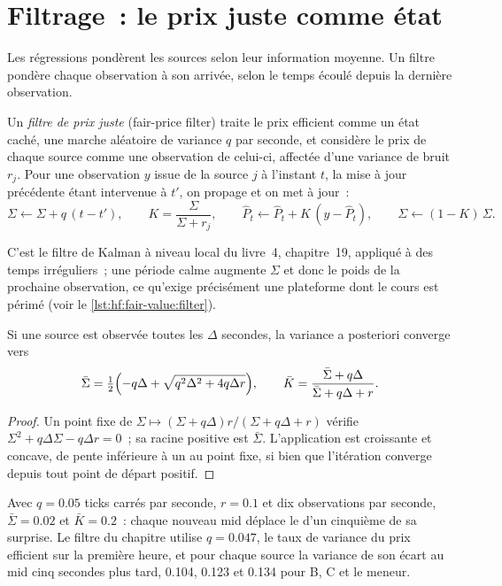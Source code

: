 \section{Filtrage~: le prix juste comme état}

Les régressions pondèrent les sources selon leur information moyenne. Un filtre pondère chaque observation à son arrivée, selon le temps écoulé depuis la
dernière observation.

\begin{definition}\label{def:hf:fair-value:filter}
Un \emph{filtre de prix juste} (fair-price filter) traite le prix efficient comme un état caché, une marche aléatoire de variance $q$ par seconde, et
considère le prix de chaque source comme une observation de celui-ci, affectée d'une variance de bruit $r_j$. Pour une observation $y$ issue de la source $j$ à l'instant $t$, la mise à jour précédente
étant intervenue à $t'$, on propage et on met à jour~:
\[
\Sigma\leftarrow\Sigma+q\,(t-t'),\qquad K=\frac{\Sigma}{\Sigma+r_j},\qquad \hat P_t\leftarrow\hat P_t+K\,(y-\hat P_t),\qquad \Sigma\leftarrow(1-K)\,\Sigma .
\]
\end{definition}

C'est le filtre de Kalman à niveau local du livre~4, chapitre~19, appliqué à des temps irréguliers~; une période calme augmente $\Sigma$ et donc le poids de la
prochaine observation, ce qu'exige précisément une plateforme dont le cours est périmé (voir le \cref{lst:hf:fair-value:filter}).

\begin{proposition}\label{prop:hf:fair-value:steady}
Si une source est observée toutes les $\Delta$ secondes, la variance a posteriori converge vers
\[
\bar\Sigma=\tfrac12\Bigl(-q\Delta+\sqrt{q^2\Delta^2+4q\Delta r}\Bigr),\qquad \bar K=\frac{\bar\Sigma+q\Delta}{\bar\Sigma+q\Delta+r}.
\]
\end{proposition}

\begin{proof}
Un point fixe de $\Sigma\mapsto (\Sigma+q\Delta)r/(\Sigma+q\Delta+r)$ vérifie $\Sigma^2+q\Delta\Sigma-q\Delta r=0$~; sa racine positive est
$\bar\Sigma$. L'application est croissante
et concave, de pente inférieure à un au point fixe, si bien que l'itération converge depuis tout point de départ positif.
\end{proof}

Avec $q=0.05$ ticks carrés par seconde, $r=0.1$ et dix observations par seconde, $\bar\Sigma=0.02$ et $\bar K=0.2$~: chaque nouveau mid déplace le 
d'un cinquième de sa surprise. Le filtre du chapitre utilise $q=0.047$, le taux de variance du prix efficient sur la première heure, et pour chaque source la
variance de son écart au mid cinq secondes plus tard, 0.104, 0.123 et 0.134 pour B, C et le meneur.

